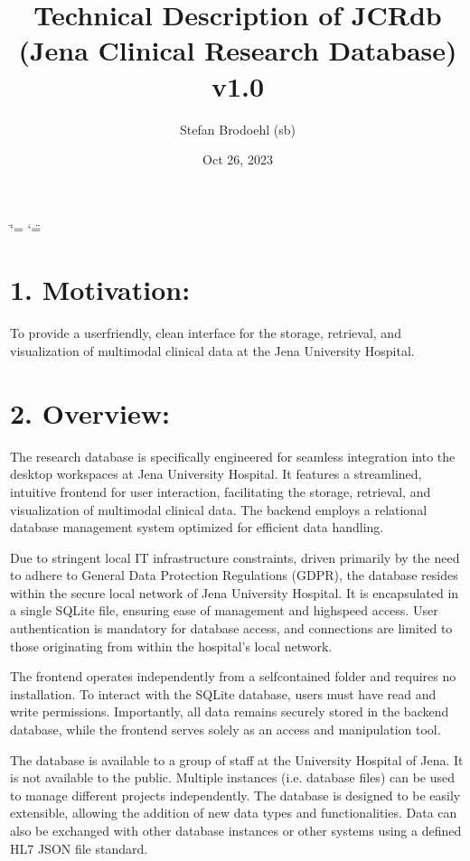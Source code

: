 \documentclass[a4paper,10pt,english]{sphinxmanual}
\title{Technical Description of JCRdb (Jena Clinical Research Database) v1.0}
\date{Oct 26, 2023}
\author{Stefan Brodoehl (sb)}
\begin{document}
\ifdefined\shorthandoff
  \ifnum\catcode`\=\string=\active\shorthandoff{=}\fi
  \ifnum\catcode`\"=\active{}\fi
\fi

\pagestyle{empty}
\sphinxmaketitle
\pagestyle{plain}
\sphinxtableofcontents
\pagestyle{normal}
\label{\detokenize{index::doc}}
\sphinxstepscope




\chapter{1. Motivation:}
\label{\detokenize{TechnicalDetails:motivation}}
\sphinxAtStartPar
To provide a user\sphinxhyphen{}friendly, clean interface for the storage, retrieval, and visualization of multimodal clinical data at the Jena University Hospital.


\chapter{2. Overview:}
\label{\detokenize{TechnicalDetails:overview}}
\sphinxAtStartPar
The research database is specifically engineered for seamless integration into the desktop workspaces at Jena University Hospital. It features a streamlined, intuitive frontend for user interaction, facilitating the storage, retrieval, and visualization of multimodal clinical data. The backend employs a relational database management system optimized for efficient data handling.

\sphinxAtStartPar
Due to stringent local IT infrastructure constraints, driven primarily by the need to adhere to General Data Protection Regulations (GDPR), the database resides within the secure local network of Jena University Hospital. It is encapsulated in a single SQLite file, ensuring ease of management and high\sphinxhyphen{}speed access. User authentication is mandatory for database access, and connections are limited to those originating from within the hospital’s local network.

\sphinxAtStartPar
The frontend operates independently from a self\sphinxhyphen{}contained folder and requires no installation. To interact with the SQLite database, users must have read and write permissions. Importantly, all data remains securely stored in the backend database, while the frontend serves solely as an access and manipulation tool.

\sphinxAtStartPar
The database is available to a group of staff at the University Hospital of Jena. It is not available to the public. Multiple instances (i.e. database files) can be used to manage different projects independently. The database is designed to be easily extensible, allowing the addition of new data types and functionalities. Data can also be exchanged with other database instances or other systems using a defined HL7 JSON file standard.
\end{document}
